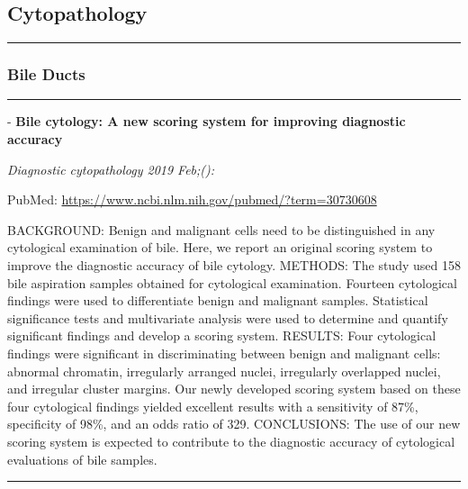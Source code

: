 \documentclass[]{article}
\begin{document}
\hypertarget{cytopathology}{%
\subsection{Cytopathology}\label{cytopathology}}

\begin{center}\rule{0.5\linewidth}{\linethickness}\end{center}

\hypertarget{bile-ducts-1}{%
\subsubsection{Bile Ducts}\label{bile-ducts-1}}

\begin{center}\rule{0.5\linewidth}{\linethickness}\end{center}

 - \textbf{Bile cytology: A new scoring system for improving diagnostic
accuracy}

\emph{Diagnostic cytopathology 2019 Feb;():}

PubMed: \url{https://www.ncbi.nlm.nih.gov/pubmed/?term=30730608}

BACKGROUND: Benign and malignant cells need to be distinguished in any
cytological examination of bile. Here, we report an original scoring
system to improve the diagnostic accuracy of bile cytology. METHODS: The
study used 158 bile aspiration samples obtained for cytological
examination. Fourteen cytological findings were used to differentiate
benign and malignant samples. Statistical significance tests and
multivariate analysis were used to determine and quantify significant
findings and develop a scoring system. RESULTS: Four cytological
findings were significant in discriminating between benign and malignant
cells: abnormal chromatin, irregularly arranged nuclei, irregularly
overlapped nuclei, and irregular cluster margins. Our newly developed
scoring system based on these four cytological findings yielded
excellent results with a sensitivity of 87\%, specificity of 98\%, and
an odds ratio of 329. CONCLUSIONS: The use of our new scoring system is
expected to contribute to the diagnostic accuracy of cytological
evaluations of bile samples.

{}

{}

\begin{center}\rule{0.5\linewidth}{\linethickness}\end{center}
\end{document}
